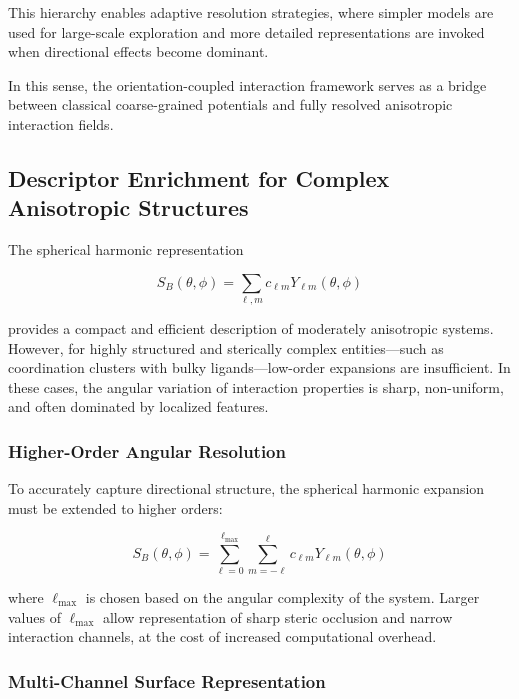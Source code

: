\documentclass[11pt]{article}
\begin{document}
This hierarchy enables adaptive resolution strategies, where simpler models are used for large-scale exploration and more detailed representations are invoked when directional effects become dominant.

In this sense, the orientation-coupled interaction framework serves as a bridge between classical coarse-grained potentials and fully resolved anisotropic interaction fields.

\subsection{Descriptor Enrichment for Complex Anisotropic Structures}

The spherical harmonic representation

\begin{equation}
S_B(\theta,\phi) = \sum_{\ell,m} c_{\ell m} Y_{\ell m}(\theta,\phi)
\end{equation}

provides a compact and efficient description of moderately anisotropic systems. However, for highly structured and sterically complex entities---such as coordination clusters with bulky ligands---low-order expansions are insufficient. In these cases, the angular variation of interaction properties is sharp, non-uniform, and often dominated by localized features.

\subsubsection{Higher-Order Angular Resolution}

To accurately capture directional structure, the spherical harmonic expansion must be extended to higher orders:

\begin{equation}
S_B(\theta,\phi) = \sum_{\ell=0}^{\ell_{\max}} \sum_{m=-\ell}^{\ell} c_{\ell m} Y_{\ell m}(\theta,\phi)
\end{equation}

where $\ell_{\max}$ is chosen based on the angular complexity of the system. Larger values of $\ell_{\max}$ allow representation of sharp steric occlusion and narrow interaction channels, at the cost of increased computational overhead.

\subsubsection{Multi-Channel Surface Representation}
\end{document}
